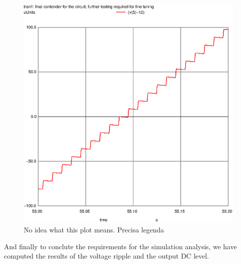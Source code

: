 \FloatBarrier
\begin{figure}
  \includegraphics[width=\linewidth]{zoom.ps}
  \caption{No idea what this plot means. Precisa legenda}
  \label{fig:theoplots}
\end{figure}
\FloatBarrier

And finally to conclute the requirements for the simulation analysis, we have computed the results of the voltage ripple and the output DC level. 

